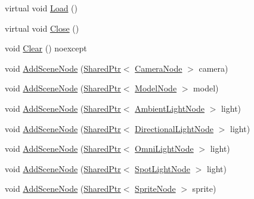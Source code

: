 \begin{DoxyCompactItemize}
\item 
virtual void \hyperlink{classmage_1_1_scene_a1fb4a93eaa2f6a9e20594e205abb9a32}{Load} ()
\item 
virtual void \hyperlink{classmage_1_1_scene_a16786d7fcf0b813e2e94061b082cfd1d}{Close} ()
\item 
void \hyperlink{classmage_1_1_scene_adf4a5b3885e34336caa5f145f55e01e1}{Clear} () noexcept
\item 
void \hyperlink{classmage_1_1_scene_a4d7e96e51563f021894800faf6136a24}{Add\+Scene\+Node} (\hyperlink{namespacemage_a1e01ae66713838a7a67d30e44c67703e}{Shared\+Ptr}$<$ \hyperlink{classmage_1_1_camera_node}{Camera\+Node} $>$ camera)
\item 
void \hyperlink{classmage_1_1_scene_a26209907f771b99f1b3e5750d0a3e6f2}{Add\+Scene\+Node} (\hyperlink{namespacemage_a1e01ae66713838a7a67d30e44c67703e}{Shared\+Ptr}$<$ \hyperlink{classmage_1_1_model_node}{Model\+Node} $>$ model)
\item 
void \hyperlink{classmage_1_1_scene_a6d89db066e89a9a6eacc5e2568913c2b}{Add\+Scene\+Node} (\hyperlink{namespacemage_a1e01ae66713838a7a67d30e44c67703e}{Shared\+Ptr}$<$ \hyperlink{namespacemage_ab0783a7428706251f8561dc30a4d228d}{Ambient\+Light\+Node} $>$ light)
\item 
void \hyperlink{classmage_1_1_scene_a92db81d9abcbc953a2beb4060b3b08da}{Add\+Scene\+Node} (\hyperlink{namespacemage_a1e01ae66713838a7a67d30e44c67703e}{Shared\+Ptr}$<$ \hyperlink{namespacemage_a7637b5351fc0f66a10badd80ebb35899}{Directional\+Light\+Node} $>$ light)
\item 
void \hyperlink{classmage_1_1_scene_acca52e00f0f8c35ec8d48979ac1255ab}{Add\+Scene\+Node} (\hyperlink{namespacemage_a1e01ae66713838a7a67d30e44c67703e}{Shared\+Ptr}$<$ \hyperlink{namespacemage_a1724c6e6b6b5ba535cdd967cbbb4a669}{Omni\+Light\+Node} $>$ light)
\item 
void \hyperlink{classmage_1_1_scene_a52056b1b263c9ab070bc55af289edc3b}{Add\+Scene\+Node} (\hyperlink{namespacemage_a1e01ae66713838a7a67d30e44c67703e}{Shared\+Ptr}$<$ \hyperlink{namespacemage_aeed5dee4ff6c591eabb0e9114256df4a}{Spot\+Light\+Node} $>$ light)
\item 
void \hyperlink{classmage_1_1_scene_ace55464eab55ec30359c0ea6587c2201}{Add\+Scene\+Node} (\hyperlink{namespacemage_a1e01ae66713838a7a67d30e44c67703e}{Shared\+Ptr}$<$ \hyperlink{classmage_1_1_sprite_node}{Sprite\+Node} $>$ sprite)
\end{DoxyCompactItemize}
